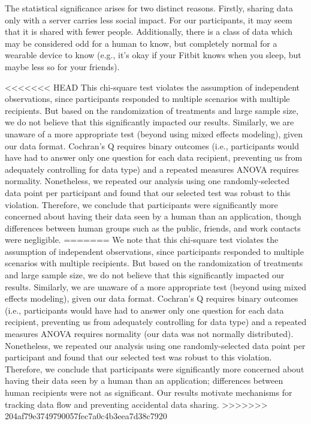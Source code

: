 \documentclass[conference]{IEEEtran}
\begin{document}
The statistical significance arises for two distinct reasons. Firstly, sharing data only with a server carries less social impact. For our participants, it may seem that it is shared with fewer people. Additionally, there is a class of data which may be considered odd for a human to know, but completely normal for a wearable device to know (e.g., it's okay if your Fitbit knows when you sleep, but maybe less so for your friends).

<<<<<<< HEAD
This chi-square test violates the assumption of independent observations, since participants responded to multiple scenarios with multiple recipients. But based on the randomization of treatments and large sample size, we do not believe that this significantly impacted our results. Similarly, we are unaware of a more appropriate test (beyond using mixed effects modeling), given our data format. Cochran's Q requires binary outcomes (i.e., participants would have had to answer only one question for each data recipient, preventing us from adequately controlling for data type) and a repeated measures ANOVA requires normality. Nonetheless, we repeated our analysis using one randomly-selected data point per participant and found that our selected test was robust to this violation. Therefore, we conclude that participants were significantly more concerned about having their data seen by a human than an application, though differences between human groups such as the public, friends, and work contacts were negligible.
=======
We note that this chi-square test violates the assumption of independent observations, since participants responded to multiple scenarios with multiple recipients. But based on the randomization of treatments and large sample size, we do not believe that this significantly impacted our results. Similarly, we are unaware of a more appropriate test (beyond using mixed effects modeling), given our data format. Cochran's Q requires binary outcomes (i.e., participants would have had to answer only one question for each data recipient, preventing us from adequately controlling for data type) and a repeated measures ANOVA requires normality (our data was not normally distributed). Nonetheless, we repeated our analysis using one randomly-selected data point per participant and found that our selected test was robust to this violation. Therefore, we conclude that participants were significantly more concerned about having their data seen by a human than an application; differences between human recipients were not as significant. Our results motivate mechanisms for tracking data flow and preventing accidental data sharing.
>>>>>>> 204af79e3749790057fec7a0c4b3eea7d38c7920
\end{document}
